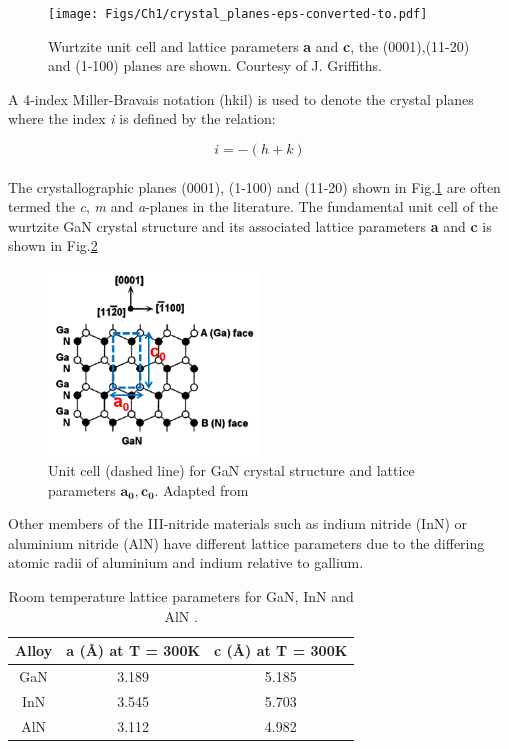 \begin{figure}[h]
	\centering
	\texttt{[image: Figs/Ch1/crystal\_planes-eps-converted-to.pdf]}
	\caption {Wurtzite unit cell and lattice parameters \textbf{a} and \textbf{c}, the (0001),(11-20) and (1-100) planes are shown. Courtesy of J. Griffiths.}
	\label{1.1}
\end{figure}
\FloatBarrier

A 4-index Miller-Bravais notation (hkil) is used to denote the crystal planes where the index {\it i} is defined by the relation:

\begin{equation}
 i = -(h+k)
 \end{equation}
\\
 
The crystallographic planes (0001), (1-100) and (11-20) shown in Fig.\ref{1.1} are often termed the {\it c}, {\it m} and {\it a}-planes in the literature. The fundamental unit cell of the wurtzite GaN crystal structure and its associated lattice parameters \textbf{a} and \textbf{c} is shown in Fig.\ref{1.2}

\begin{figure}[h]
	\centering
	\includegraphics[width=0.5\textwidth]{Figs/Ch1/unit_cell.png}
	\caption {Unit cell (dashed line) for GaN crystal structure and lattice parameters $\mathbf{a_{0}},\mathbf{c_{0}}$. Adapted from \cite{Yu1999}}
	\label{1.2}
\end{figure}
\FloatBarrier

Other members of the III-nitride materials such as indium nitride  (InN) or aluminium nitride  (AlN) have different lattice parameters due to the differing atomic radii of aluminium and indium relative to gallium.

\begin{table}[!htb]
	\centering
	
	\begin{tabular}{ccc}
		Alloy & \textbf{a} (\si{\angstrom}) at T = 300K & \textbf{c} (\si{\angstrom}) at T = 300K \\
		\hline\hline
		GaN   & 3.189   & 5.185   \\
		InN   & 3.545   & 5.703   \\
		AlN   & 3.112  & 4.982  \\ 
		\hline
	\end{tabular}
	\caption{Room temperature lattice parameters for GaN, InN and AlN \cite{Vurgaftman2003}.}
	\label{tab1.1}
\end{table}

